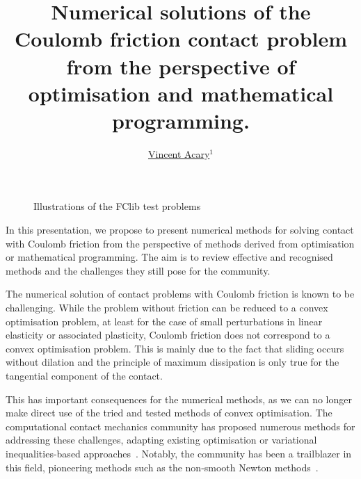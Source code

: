 \documentclass[10pt]{icccm2025}
\title{Numerical solutions of the Coulomb friction contact problem from the perspective of optimisation and mathematical programming.}
\author{\underline{Vincent Acary}$^{1}$}
\begin{document}
\vspace{-0.8cm}
\def\figillus{0.1\textheight}
\begin{figure}[htbp]
  \centering
  \caption{Illustrations of the FClib test problems}
  \label{fig:fclib}
\end{figure}
\vspace{-0.3cm}
\noindent In this presentation, we propose to present numerical methods for solving contact with Coulomb friction from the perspective of methods derived from optimisation or mathematical programming.
The aim is to review effective and recognised methods and the challenges they still pose for the community.

 The numerical solution of contact problems with Coulomb friction is known to be challenging.
While the problem without friction can be reduced to a convex optimisation problem, at least for the case of small perturbations in linear elasticity or associated plasticity, Coulomb friction does not correspond to a  convex optimisation problem.
This is mainly due to the fact that sliding occurs without dilation and the principle of maximum dissipation is only true for the tangential component of the contact.

This has important consequences for the numerical methods, as we can no longer make direct use of the tried and tested methods of convex optimisation.
The computational contact mechanics community has proposed numerous methods for addressing these challenges, adapting existing optimisation or variational inequalities-based approaches~\cite{Acary.Brogliato2008,Wriggers2006,Laursen2003,Dostal.ea_Book2023}.
Notably, the community has been a trailblazer in this field, pioneering methods such as the non-smooth Newton methods~\cite{Alart.Curnier1991}.
\end{document}
